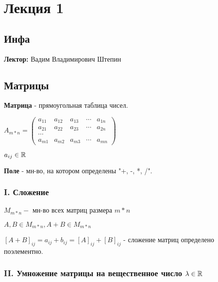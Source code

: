 \section{Лекция 1}

\subsection{Инфа}
\textbf{Лектор:} Вадим Владимирович Штепин

\subsection{Матрицы}

\begin{definition}
\textbf{Матрица} - прямоугольная таблица чисел.
\end{definition}

\begin{symb}
    $A_{m*n} = \begin{pmatrix} a_{11} & a_{12} & a_{13} & \cdots & a_{1n} \\ 
    a_{21} & a_{22} & a_{23} & \cdots & a_{2n} \\ 
    \cdots \\ 
a_{m1} & a_{m2} & a_{m3} & \cdots & a_{mn}\end{pmatrix}$

    $a_{ij} \in \mathbb{R}$
\end{symb}

\begin{definition}
\textbf{Поле} - мн-во, на котором определены "+, -, *, /".
\end{definition}

\subsubsection{I. Сложение}

\begin{symb}
$M_{m * n} - $ мн-во всех матриц размера $m * n$

$A, B \in M_{m * n}, A + B \in M_{m * n}$
\end{symb}

\begin{definition}
    $[A + B]_{ij} = a_{ij} + b_{ij} = [A]_{ij} + [B]_{ij}$ - сложение матриц определено поэлементно.
\end{definition}

\subsubsection{II. Умножение матрицы на вещественное число $\lambda \in \mathbb{R}$}


